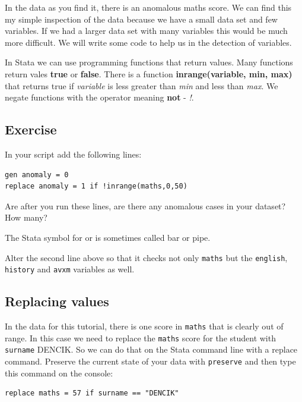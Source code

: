 \documentclass[
]{article}
\begin{document}
In the data as you find it, there is an anomalous maths score. We can find this my simple inspection of the data because we have a small data set and few variables. If we had a larger data set with many variables this would be much more difficult. We will write some code to help us in the detection of variables.

In Stata we can use programming functions that return values. Many functions return vales \textbf{true} or \textbf{false}. There is a function \textbf{inrange(variable, min, max)} that returns true if \emph{variable} is less greater than \emph{min} and less than \emph{max}. We negate functions with the operator meaning \textbf{not} - \emph{!}.

\hypertarget{exercise-5}{%
\subsection{Exercise}\label{exercise-5}}

In your script add the following lines:

\begin{verbatim}
gen anomaly = 0
replace anomaly = 1 if !inrange(maths,0,50)
\end{verbatim}

Are after you run these lines, are there any anomalous cases in your dataset? How many?

The Stata symbol for or is \textbf{\textbar{}} sometimes called bar or pipe.

Alter the second line above so that it checks not only \texttt{maths} but the \texttt{english}, \texttt{history} and \texttt{avxm} variables as well.

\hypertarget{replacing-values}{%
\subsection{Replacing values}\label{replacing-values}}

In the data for this tutorial, there is one score in \texttt{maths} that is clearly out of range. In this case we need to replace the \texttt{maths} score for the student with \texttt{surname} DENCIK. So we can do that on the Stata command line with a replace command. Preserve the current state of your data with \texttt{preserve} and then type this command on the console:

\begin{verbatim}
replace maths = 57 if surname == "DENCIK"
\end{verbatim}
\end{document}
